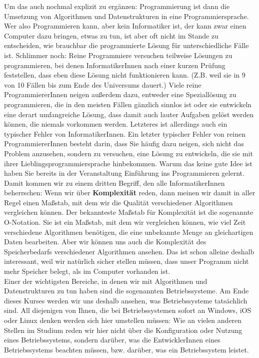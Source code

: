 Um das auch nochmal explizit zu ergänzen: Programmierung ist dann die Umsetzung von Algorithmen und Datenstrukturen in eine Programmiersprache. Wer also Programmieren kann, aber kein Informatiker ist, der kann zwar einen Computer dazu bringen, etwas zu tun, ist aber oft nicht im Stande zu entscheiden, wie brauchbar die programmierte Lösung für unterschiedliche Fälle ist. Schlimmer noch: Reine Programmiere versuchen teilweise Lösungen zu programmieren, bei denen InformatikerInnen nach einer kurzen Prüfung feststellen, dass eben diese Lösung nicht funktionieren kann. (Z.B. weil sie in 9 von 10 Fällen bis zum Ende des Universums dauert.) Viele reine ProgrammiererInnen neigen außerdem dazu, entweder eine Speziallösung zu programmieren, die in den meisten Fällen gänzlich sinnlos ist oder sie entwickeln eine derart umfangreiche Lösung, dass damit auch lauter Aufgaben gelöst werden können, die niemals vorkommen werden. Letzteres ist allerdings auch ein typischer Fehler von InformatikerInnen. Ein letzter typischer Fehler von reinen ProgrammiererInnen besteht darin, dass Sie häufig dazu neigen, sich nicht das Problem anzusehen, sondern zu versuchen, eine Lösung zu entwickeln, die sie mit ihrer Lieblingsprogrammiersprache hinbekommen. Warum das keine gute Idee ist haben Sie bereits in der Veranstaltung \glqq{}Einführung ins Programmieren\grqq{} gelernt.\\

Damit kommen wir zu einem dritten Begriff, den alle InformatikerInnen beherrschen: Wenn wir über \textbf{Komplexität} reden, dann meinen wir damit in aller Regel einen Maßstab, mit dem wir die Qualität verschiedener Algorithmen vergleichen können. Der bekannteste Maßstab für Komplexität ist die sogenannte O-Notation. Sie ist ein Maßstab, mit dem wir vergleichen können, wie viel Zeit verschiedene Algorithmen benötigen, die eine unbekannte Menge an gleichartigen Daten bearbeiten. Aber wir können uns auch die Komplexität des Speicherbedarfs verschiedener Algorithmen ansehen. Das ist schon alleine deshalb interessant, weil wir natürlich sicher stellen müssen, dass unser Programm nicht mehr Speicher belegt, als im Computer vorhanden ist.\\

Einer der wichtigsten Bereiche, in denen wir mit Algorithmen und Datenstrukturen zu tun haben sind die sogenannten Betriebssysteme. Am Ende dieses Kurses werden wir uns deshalb ansehen, was Betriebssysteme tatsächlich sind. All diejenigen von Ihnen, die bei Betriebssystemen sofort an Windows, iOS oder Linux denken werden sich hier umstellen müssen: Wie an vielen anderen Stellen im Studium reden wir hier nicht über die Konfiguration oder Nutzung eines Betriebssystems, sondern darüber, was die EntwicklerInnen eines Betriebssystems beachten müssen, bzw. darüber, was ein Betriebssystem leistet.\\

